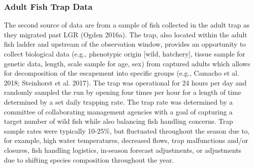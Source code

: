 \documentclass[
  12pt,
]{article}
\begin{document}
\hypertarget{adult-fish-trap-data}{%
\subsubsection{Adult Fish Trap Data}\label{adult-fish-trap-data}}

The second source of data are from a sample of fish collected in the adult trap as they migrated past LGR (Ogden 2016a). The trap, also located within the adult fish ladder and upstream of the observation window, provides an opportunity to collect biological data (e.g., phenotypic origin {[}wild, hatchery{]}, tissue sample for genetic data, length, scale sample for age, sex) from captured adults which allows for decomposition of the escapement into specific groups (e.g., Camacho et al. 2018; Steinhorst et al. 2017). The trap was operational for 24 hours per day and randomly sampled the run by opening four times per hour for a length of time determined by a set daily trapping rate. The trap rate was determined by a committee of collaborating management agencies with a goal of capturing a target number of wild fish while also balancing fish handling concerns. Trap sample rates were typically 10-25\%, but fluctuated throughout the season due to, for example, high water temperatures, decreased flows, trap malfunctions and/or closures, fish handling logistics, in-season forecast adjustments, or adjustments due to shifting species composition throughout the year.
\end{document}
